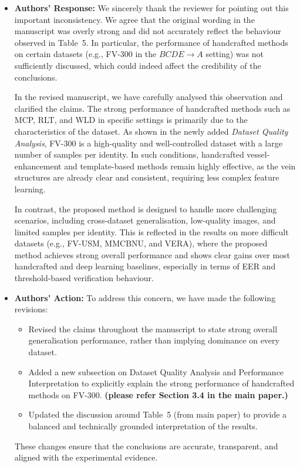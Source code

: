 \documentclass[11pt]{article}
\theoremstyle{remark}
\begin{document}
\begin{itemize}
	\item \textbf{Authors' Response:} 
	We sincerely thank the reviewer for pointing out this important inconsistency. We agree that the original wording in the manuscript was overly strong and did not accurately reflect the behaviour observed in Table~5. In particular, the performance of handcrafted methods on certain datasets (e.g., FV-300 in the $BCDE \rightarrow A$ setting) was not sufficiently discussed, which could indeed affect the credibility of the conclusions.

	In the revised manuscript, we have carefully analysed this observation and clarified the claims. The strong performance of handcrafted methods such as MCP, RLT, and WLD in specific settings is primarily due to the characteristics of the dataset. As shown in the newly added \emph{Dataset Quality Analysis}, FV-300 is a high-quality and well-controlled dataset with a large number of samples per identity. In such conditions, handcrafted vessel-enhancement and template-based methods remain highly effective, as the vein structures are already clear and consistent, requiring less complex feature learning.

	In contrast, the proposed method is designed to handle more challenging scenarios, including cross-dataset generalisation, low-quality images, and limited samples per identity. This is reflected in the results on more difficult datasets (e.g., FV-USM, MMCBNU, and VERA), where the proposed method achieves strong overall performance and shows clear gains over most handcrafted and deep learning baselines, especially in terms of EER and threshold-based verification behaviour.


	\item \textbf{Authors' Action:} 
	To address this concern, we have made the following revisions:
	\begin{itemize}
	    \item Revised the claims throughout the manuscript to state {strong overall generalisation performance}, rather than implying dominance on every dataset.
	    \item Added a new subsection on {Dataset Quality Analysis and Performance Interpretation} to explicitly explain the strong performance of handcrafted methods on FV-300. \textbf{(please refer Section 3.4 in the main paper.)}
	    \item Updated the discussion around Table~5 (from main paper) to provide a balanced and technically grounded interpretation of the results.
	\end{itemize}

	These changes ensure that the conclusions are accurate, transparent, and aligned with the experimental evidence.
\end{itemize}
\end{document}
